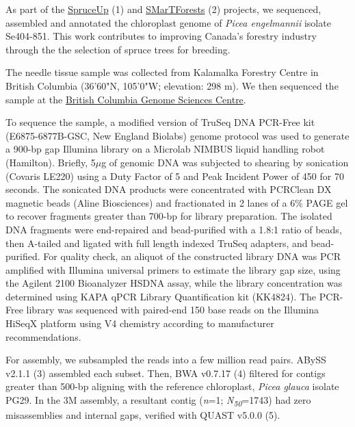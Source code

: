 \documentclass[titlepage,11pt, oneside]{article}   	%
\begin{document}
As part of the \href{http://spruce-up.ca/en/}{SpruceUp} (1) and \href{https://www.smartforests.ca}{SMarTForests} (2) projects, we sequenced, assembled and annotated the chloroplast genome of \textit{Picea engelmannii} isolate Se404-851. This work contributes to improving Canada's forestry industry through the the selection of spruce trees for breeding.
\newline
\par
The needle tissue sample was collected from Kalamalka Forestry Centre in British Columbia (36'60"N, 105'0"W; elevation: 298 m). We then sequenced the sample at the \href{http://www.bcgsc.ca}{British Columbia Genome Sciences Centre}.
\newline
\par
To sequence the sample, a modified version of TruSeq DNA PCR-Free kit (E6875-6877B-GSC, New England Biolabs) genome protocol was used to generate a 900-bp gap Illumina library on a Microlab NIMBUS liquid handling robot (Hamilton). Briefly, 5$\mu$g of genomic DNA was subjected to shearing by sonication (Covaris LE220) using a Duty Factor of 5 and Peak Incident Power of 450 for 70 seconds. The sonicated DNA products were concentrated with PCRClean DX magnetic beads (Aline Biosciences) and fractionated in 2 lanes of a 6\% PAGE gel to recover fragments greater than 700-bp for library preparation.  The isolated DNA fragments were end-repaired and bead-purified with a 1.8:1 ratio of beads, then A-tailed and ligated with full length indexed TruSeq adapters, and bead-purified. For quality check, an aliquot of the constructed library DNA was PCR amplified with Illumina universal primers to estimate the library gap size, using the Agilent 2100 Bioanalyzer HSDNA assay, while the library concentration was determined using KAPA qPCR Library Quantification kit (KK4824). The PCR-Free library was sequenced with paired-end 150 base reads on the Illumina HiSeqX platform using V4 chemistry according to manufacturer recommendations.
\newline
\par
For assembly, we subsampled the reads into a few million read pairs. ABySS v2.1.1 (3) assembled each subset. Then, BWA v0.7.17 (4) filtered for contigs greater than 500-bp aligning with the reference chloroplast, \textit{Picea glauca} isolate PG29. In the 3M assembly, a resultant contig (\textit{n}=1; \textit{N\textsubscript{50}}=1743) had zero misassemblies and internal gaps, verified with QUAST v5.0.0 (5).
\newline
\par
\end{document}
